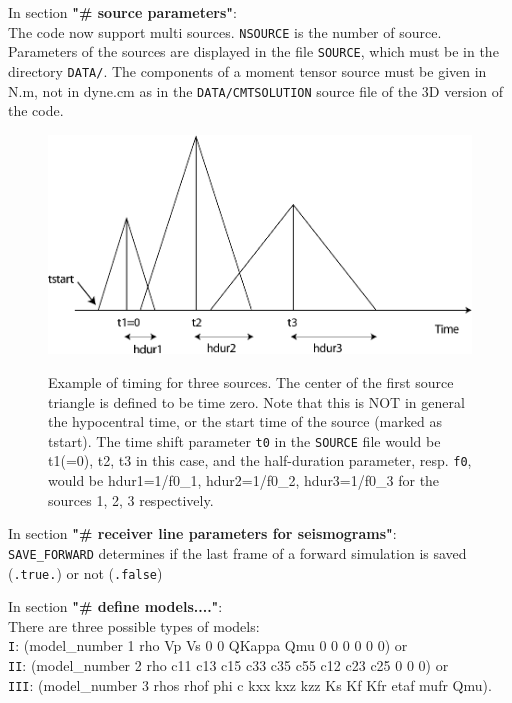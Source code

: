 \documentclass[oneside,english,onecolumn,letterpaper]{book}
\begin{document}
\begin{description}
\item In section {\bf "\# source parameters"}:\\
The code now support multi sources.
\texttt{NSOURCE} is the number of source.
Parameters of the sources are displayed in the file \texttt{SOURCE}, which must be
in the directory \texttt{DATA/}. The components of a moment tensor source must be given in N.m,
not in dyne.cm as in the \texttt{DATA/CMTSOLUTION} source file of the 3D version of the code.
{\small }%
\begin{figure}[htbp]
\noindent \begin{centering}
{\small \includegraphics[width=5in]{figures/source_timing.pdf} }
\par\end{centering}{\small \par}
\caption{Example of timing for three sources. The center of the first source
triangle is defined to be time zero. Note that this is NOT in general
the hypocentral time, or the start time of the source (marked as tstart).
The time shift parameter \texttt{t0} in the \texttt{SOURCE} file
would be t1(=0), t2, t3 in this case, and the half-duration parameter, resp. \texttt{f0},
would be hdur1=1/f0\_1, hdur2=1/f0\_2, hdur3=1/f0\_3 for the sources 1, 2, 3 respectively.}
{\small \label{fig:source_timing} }
\end{figure}
{\small \par}


\item In section {\bf "\# receiver line parameters for seismograms"}:\\
\texttt{SAVE\_FORWARD} determines if the last frame of a forward simulation is saved (\texttt{.true.}) or not (\texttt{.false})

\item In section {\bf "\# define models...."}:\\
There are three possible types of models:\\
 \texttt{I}:   (model\_number 1 rho Vp Vs 0 0 QKappa Qmu 0 0 0 0 0 0) or\\
 \texttt{II}:  (model\_number 2 rho c11 c13 c15 c33 c35 c55 c12 c23 c25 0 0 0) or\\
 \texttt{III}: (model\_number 3 rhos rhof phi c kxx kxz kzz Ks Kf Kfr etaf mufr Qmu). \\


\end{description}
\end{document}
